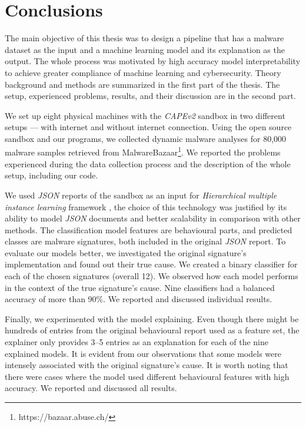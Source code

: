 \chapter{Conclusions} \label{chap:concl}
The main objective of this thesis was to design a pipeline that has a malware dataset as the input and a machine learning model and its explanation as the output. The whole process was motivated by high accuracy model interpretability to achieve greater compliance of machine learning and cybersecurity. Theory background and methods are summarized in the first part of the thesis. The setup, experienced problems, results, and their discussion are in the second part.

We set up eight physical machines with the \emph{CAPEv2} sandbox in two different setups --- with internet and without internet connection. Using the open source sandbox and our programs, we collected dynamic malware analyses for 80,000 malware samples retrieved from MalwareBazaar\footnote{https://bazaar.abuse.ch/}. We reported the problems experienced during the data collection process and the description of the whole setup, including our code.

We used \emph{JSON} reports of the sandbox as an input for \emph{Hierarchical multiple instance learning} framework \cite{Mandlik2020}, the choice of this technology was justified by its ability to model \emph{JSON} documents and better scalability in comparison with other methods. The classification model features are behavioural parts, and predicted classes are malware signatures, both included in the original \emph{JSON} report. 
To evaluate our models better, we investigated the original signature's implementation and found out their true cause. We created a binary classifier for each of the chosen signatures (overall 12). We observed how each model performs in the context of the true signature's cause. Nine classifiers had a balanced accuracy of more than 90\%. We reported and discussed individual results.

Finally, we experimented with the model explaining. Even though there might be hundreds of entries from the original behavioural report used as a feature set, the explainer only provides 3--5 entries as an explanation for each of the nine explained models. It is evident from our observations that some models were intensely associated with the original signature's cause. It is worth noting that there were cases where the model used different behavioural features with high accuracy. We reported and discussed all results.

